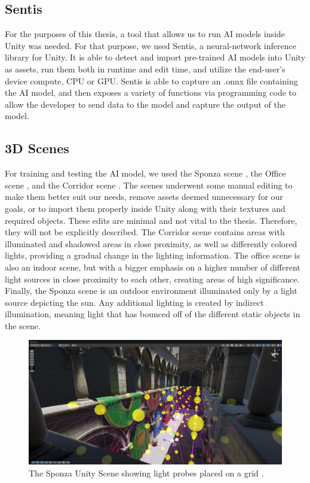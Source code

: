 \subsection{Sentis}
For the purposes of this thesis, a tool that allows us to run AI models inside Unity was needed. For that purpose, we used Sentis, a neural-network inference library for Unity. It is able to detect and import pre-trained AI models into Unity as assets, run them both in runtime and edit time, and utilize the end-user's device compute, CPU or GPU. Sentis is able to capture an .onnx file containing the AI model, and then exposes a variety of functions via programming code to allow the developer to send data to the model and capture the output of the model.

\subsection{3D Scenes}
For training and testing the AI model, we used the Sponza scene \parencite{Sponza2017}, the Office scene \parencite{Office2021}, and the Corridor scene \parencite{Corridor2021}. The scenes underwent some manual editing to make them better suit our needs, remove assets deemed unnecessary for our goals, or to import them properly inside Unity along with their textures and required objects. These edits are minimal and not vital to the thesis. Therefore, they will not be explicitly described. The Corridor scene contains areas with illuminated and shadowed areas in close proximity, as well as differently colored lights, providing a gradual change in the lighting information. The office scene is also an indoor scene, but with a bigger emphasis on a higher number of different light sources in close proximity to each other, creating areas of high significance. Finally, the Sponza scene is an outdoor environment illuminated only by a light source depicting the sun. Any additional lighting is created by indirect illumination, meaning light that has bounced off of the different static objects in the scene.

\begin{figure}[h]
	\centering
	\includegraphics[width=\linewidth]{Graphics/Sponza_lightprobes.jpg}
	\caption{The Sponza Unity Scene showing light probes placed on a grid \parencite{Sponza2017}.}
	\label{fig:Sponza_lp}
\end{figure}


